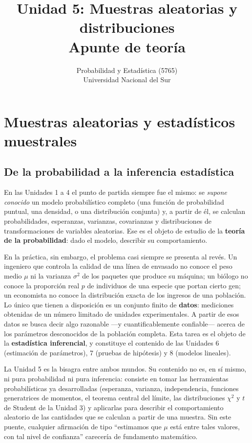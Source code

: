 \documentclass[11pt,a4paper]{article}
\title{Unidad 5: Muestras aleatorias y distribuciones \\ \large Apunte de teoría}
\author{Probabilidad y Estadística (5765) \\ Universidad Nacional del Sur}
\date{}
\theoremstyle{plain}
\theoremstyle{definition}
\theoremstyle{remark}
\begin{document}
\maketitle
\tableofcontents
\newpage

\section{Muestras aleatorias y estadísticos muestrales}

\subsection{De la probabilidad a la inferencia estadística}

En las Unidades 1 a 4 el punto de partida siempre fue el mismo: se \emph{supone conocido} un modelo probabilístico completo (una función de probabilidad puntual, una densidad, o una distribución conjunta) y, a partir de él, se calculan probabilidades, esperanzas, varianzas, covarianzas y distribuciones de transformaciones de variables aleatorias. Ese es el objeto de estudio de la \textbf{teoría de la probabilidad}: dado el modelo, describir su comportamiento.

En la práctica, sin embargo, el problema casi siempre se presenta al revés. Un ingeniero que controla la calidad de una línea de envasado no conoce el peso medio $\mu$ ni la varianza $\sigma^2$ de los paquetes que produce su máquina; un biólogo no conoce la proporción real $p$ de individuos de una especie que portan cierto gen; un economista no conoce la distribución exacta de los ingresos de una población. Lo único que tienen a disposición es un conjunto finito de \textbf{datos}: mediciones obtenidas de un número limitado de unidades experimentales. A partir de esos datos se busca decir algo razonable —y cuantificablemente confiable— acerca de los parámetros desconocidos de la población completa. Esta tarea es el objeto de la \textbf{estadística inferencial}, y constituye el contenido de las Unidades 6 (estimación de parámetros), 7 (pruebas de hipótesis) y 8 (modelos lineales).

La Unidad 5 es la bisagra entre ambos mundos. Su contenido no es, en sí mismo, ni pura probabilidad ni pura inferencia: consiste en tomar las herramientas probabilísticas ya desarrolladas (esperanza, varianza, independencia, funciones generatrices de momentos, el teorema central del límite, las distribuciones $\chi^2$ y $t$ de Student de la Unidad 3) y aplicarlas para describir el comportamiento aleatorio de las cantidades que se calculan a partir de una muestra. Sin este puente, cualquier afirmación de tipo ``estimamos que $\mu$ está entre tales valores, con tal nivel de confianza'' carecería de fundamento matemático.
\end{document}
